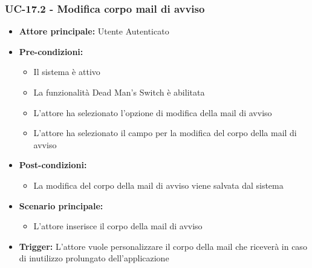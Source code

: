 \documentclass[a4paper,12pt]{article}
\begin{document}
\subsubsection{UC-17.2 - Modifica corpo mail di avviso} \label{sec:UC-17.2}
\begin{itemize}
    \item \textbf{Attore principale:} Utente Autenticato
    \item \textbf{Pre-condizioni:}
    \begin{itemize}
        \item Il sistema è attivo
        \item La funzionalità Dead Man's Switch è abilitata
        \item L'attore ha selezionato l'opzione di modifica della mail di avviso
        \item L'attore ha selezionato il campo per la modifica del corpo della mail di avviso
    \end{itemize}
    \item \textbf{Post-condizioni:}
    \begin{itemize}
        \item La modifica del corpo della mail di avviso viene salvata dal sistema
    \end{itemize}
    \item \textbf{Scenario principale:} 
    \begin{itemize}
        \item L'attore inserisce il corpo della mail di avviso
    \end{itemize}
    \item \textbf{Trigger:} L'attore vuole personalizzare il corpo della mail che riceverà in caso di inutilizzo prolungato dell'applicazione
\end{itemize}
\end{document}
